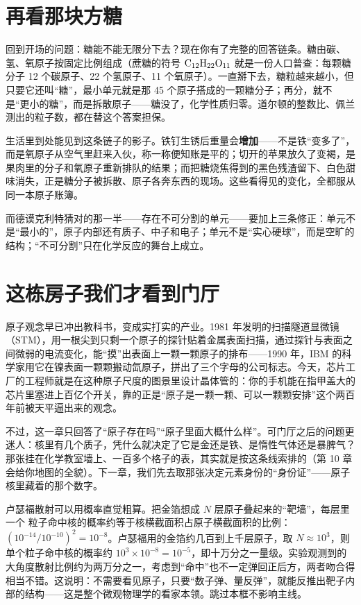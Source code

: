 \section{再看那块方糖}

回到开场的问题：糖能不能无限分下去？现在你有了完整的回答链条。糖由碳、氢、氧原子按固定比例组成（蔗糖的符号 $\mathrm{C_{12}H_{22}O_{11}}$ 就是一份人口普查：每颗糖分子 12 个碳原子、22 个氢原子、11 个氧原子）。一直掰下去，糖粒越来越小，但只要它还叫“糖”，最小单元就是那 45 个原子搭成的一颗糖分子；再分，就不是“更小的糖”，而是拆散原子——糖没了，化学性质归零。道尔顿的整数比、佩兰测出的粒子数，都在替这个答案担保。

生活里到处能见到这条链子的影子。铁钉生锈后重量会\textbf{增加}——不是铁“变多了”，而是氧原子从空气里赶来入伙，称一称便知账是平的；切开的苹果放久了变褐，是果肉里的分子和氧原子重新排队的结果；而把糖烧焦得到的黑色残渣留下、白色甜味消失，正是糖分子被拆散、原子各奔东西的现场。这些看得见的变化，全都服从同一本原子账簿。

而德谟克利特猜对的那一半——存在不可分割的单元——要加上三条修正：单元不是“最小的”，原子内部还有质子、中子和电子；单元不是“实心硬球”，而是空旷的结构；“不可分割”只在化学反应的舞台上成立。

\section{这栋房子我们才看到门厅}

原子观念早已冲出教科书，变成实打实的产业。1981 年发明的扫描隧道显微镜（STM），用一根尖到只剩一个原子的探针贴着金属表面扫描，通过探针与表面之间微弱的电流变化，能“摸”出表面上一颗一颗原子的排布——1990 年，IBM 的科学家用它在镍表面一颗颗搬动氙原子，拼出了三个字母的公司标志。今天，芯片工厂的工程师就是在这种原子尺度的图景里设计晶体管的：你的手机能在指甲盖大的芯片里塞进上百亿个开关，靠的正是“原子是一颗一颗、可以一颗颗安排”这个两百年前被天平逼出来的观念。

不过，这一章只回答了“原子存在吗”“原子里面大概什么样”。可门厅之后的问题更迷人：核里有几个质子，凭什么就决定了它是金还是铁、是惰性气体还是暴脾气？那张挂在化学教室墙上、一百多个格子的表，其实就是按这条线索排的（第 10 章会给你地图的全貌）。下一章，我们先去取那张决定元素身份的“身份证”——原子核里藏着的那个数字。

\begin{tiaozhan}
卢瑟福散射可以用概率直觉粗算。把金箔想成 $N$ 层原子叠起来的“靶墙”，每层里一个 \chem{\alpha} 粒子命中核的概率约等于核横截面积占原子横截面积的比例：$(10^{-14}/10^{-10})^2 = 10^{-8}$。卢瑟福用的金箔约几百到上千层原子，取 $N \approx 10^3$，则单个粒子命中核的概率约 $10^3 \times 10^{-8} = 10^{-5}$，即十万分之一量级。实验观测到的大角度散射比例约为两万分之一，考虑到“命中”也不一定弹回正后方，两者吻合得相当不错。这说明：不需要看见原子，只要“数子弹、量反弹”，就能反推出靶子内部的结构——这是整个微观物理学的看家本领。跳过本框不影响主线。
\end{tiaozhan}

